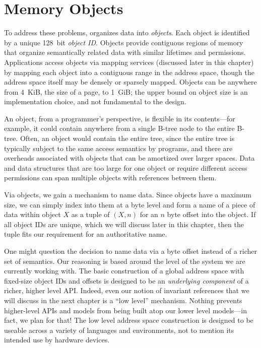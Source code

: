 \section{Memory Objects}
To address these problems, \Twizzler organizes data into \emph{objects}. Each object is
identified by a unique 128~bit \emph{object ID}.
Objects provide contiguous regions of memory that organize
semantically related data with similar lifetimes and permissions.
Applications access objects via
mapping services (discussed later in this chapter) by mapping each object into a contiguous range
in the address space, though the address space itself may be densely or sparsely mapped.
Objects can be anywhere from 4~KiB, the size of a page, to 1~GiB; the upper bound on object size is
an implementation choice, and not fundamental to the design.


An object, from a programmer's perspective, is flexible in its
contents---for example, it could contain anywhere from a single B-tree node to the entire B-tree.
Often, an object would contain the entire tree, since the entire tree is typically subject to
the same access semantics by programs, and there are overheads associated with objects that can be
amortized over larger spaces. Data and data structures that are too large for one object or require
different access permissions can span multiple objects with references between them.

Via objects, we gain a mechanism to name data. Since objects have a maximum size, we can simply index into them at a
byte level and form a name of a piece of data within object $X$ as a tuple of $(X, n)$ for an $n$ byte offset into the
object. If all object IDs are unique, which we will discuss later in this chapter, then the tuple fits our requirement
for an authoritative name.

One might question the decision to name data via a byte offset instead of a richer set of semantics. Our reasoning is
based around the level of the system we are currently working with. The basic construction of a global address space
with fixed-size object IDs and offsets is designed to be an \emph{underlying component} of a richer, higher level API.
Indeed, even our notion of invariant references that we will discuss in the next chapter is a ``low level'' mechanism.
Nothing prevents higher-level APIs and models from being built atop our lower level models---in fact, we plan for that!
The low level address space construction is designed to be useable across a variety of languages and environments, not to
mention its intended use by hardware devices.

